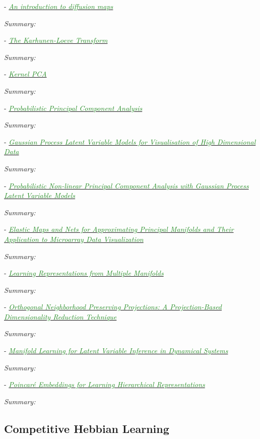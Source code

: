 \documentclass[]{article}
\newcommand{\paperentry}[4]{
            \hangindent=1cm
            \cite{#1} - \href{run:../References/#3}{\textcolor{ForestGreen}{\textit{#2}}}
            
            \noindent            
            \begin{minipage}[t]{0.1\linewidth}\hfill\end{minipage}
            \begin{minipage}[t]{0.8\linewidth}\textcolor{NavyBlue}{{\textit{Summary:}}}#4\end{minipage}
            \vspace{.25cm}
          }
\begin{document}
	\paperentry{Delaporte2008DiffusionMaps}
	{An introduction to diffusion maps}
	{Manifold_Representation_Learning/Manifold/Delaporte2008DiffusionMaps}
	{}
	
	\paperentry{Theodoris2008PCA}
	{The Karhunen-Loeve Transform}
	{}
	{}
	
	\paperentry{Theodoris2008KPCA}
	{Kernel PCA}
	{}
	{}
	
	\paperentry{Tipping1999PPCA}
	{Probabilistic Principal Component Analysis}
	{Manifold_Representation_Learning/Manifold/Tipping1999PPCA.pdf}
	{}
	
	\paperentry{Lawrence2003GPLVM}
	{Gaussian Process Latent Variable Models for Visualisation of High Dimensional Data}
	{Manifold_Representation_Learning/Manifold/Lawrence2003GPLVM.pdf}
	{}
	
	\paperentry{Lawrence2005PPCAGPLVModels}
	{Probabilistic Non-linear Principal Component Analysis with Gaussian Process Latent Variable Models}
	{Manifold_Representation_Learning/Manifold/Lawrence2005PPCAGPLVModels.pdf}
	{}
	
	\paperentry{Gorban2007ElasticMaps}
	{Elastic Maps and Nets for Approximating Principal Manifolds and Their Application to Microarray Data Visualization}
	{Manifold_Representation_Learning/Manifold/Gorban2007ElasticMaps.pdf}
	{}
	
	\paperentry{Lee2015MultipleManifolds}
	{Learning Representations from Multiple Manifolds}
	{Manifold_Representation_Learning/Manifold/Lee2015MultipleManifolds.pdf}
	{}
	
	\paperentry{Kokiopoulou2007OrthoNeighborhoodPreservingProjections}
	{Orthogonal Neighborhood Preserving Projections: A Projection-Based Dimensionality Reduction Technique}
	{Manifold_Representation_Learning/Manifold/Kokiopoulou2007OrthoNeighborhoodPreservingProjections.pdf}
	{}
	
	\paperentry{Talmon2015ManifoldLearningInDynamicalSystems}
	{Manifold Learning for Latent Variable Inference in Dynamical Systems}
	{Manifold_Representation_Learning/Manifold/Talmon2015ManifoldLearningInDynamicalSystems.pdf}
	{}
	
	\paperentry{Nickel2017PoincareEmbeddings}
	{Poincar\'{e} Embeddings for Learning Hierarchical Representations}
	{Manifold_Representation_Learning/Manifold/Nickel2017PoincareEmbeddings.pdf}
	{}
	
	
	
	\subsection{Competitive Hebbian Learning}
	
\end{document}

